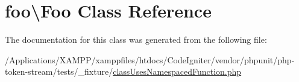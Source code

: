 \hypertarget{classfoo_1_1_foo}{}\section{foo\textbackslash{}Foo Class Reference}
\label{classfoo_1_1_foo}


The documentation for this class was generated from the following file\+:\begin{DoxyCompactItemize}
\item 
/\+Applications/\+X\+A\+M\+P\+P/xamppfiles/htdocs/\+Code\+Igniter/vendor/phpunit/php-\/token-\/stream/tests/\+\_\+fixture/\mbox{\hyperlink{class_uses_namespaced_function_8php}{class\+Uses\+Namespaced\+Function.\+php}}\end{DoxyCompactItemize}
